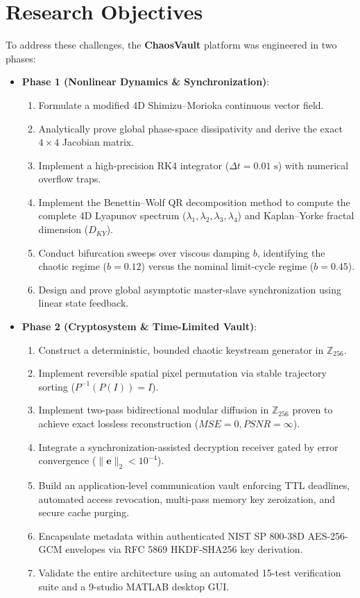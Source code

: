 \documentclass[12pt,a4paper,oneside]{report}
\begin{document}
\section{Research Objectives}
To address these challenges, the \textbf{ChaosVault} platform was engineered in two phases:
\begin{itemize}
    \item \textbf{Phase 1 (Nonlinear Dynamics \& Synchronization)}:
    \begin{enumerate}
        \item Formulate a modified 4D Shimizu--Morioka continuous vector field.
        \item Analytically prove global phase-space dissipativity and derive the exact $4 \times 4$ Jacobian matrix.
        \item Implement a high-precision RK4 integrator ($\Delta t = 0.01\text{ s}$) with numerical overflow traps.
        \item Implement the Benettin--Wolf QR decomposition method to compute the complete 4D Lyapunov spectrum ($\lambda_1, \lambda_2, \lambda_3, \lambda_4$) and Kaplan--Yorke fractal dimension ($D_{KY}$).
        \item Conduct bifurcation sweeps over viscous damping $b$, identifying the chaotic regime ($b=0.12$) versus the nominal limit-cycle regime ($b=0.45$).
        \item Design and prove global asymptotic master-slave synchronization using linear state feedback.
    \end{enumerate}
    \item \textbf{Phase 2 (Cryptosystem \& Time-Limited Vault)}:
    \begin{enumerate}
        \item Construct a deterministic, bounded chaotic keystream generator in $\mathbb{Z}_{256}$.
        \item Implement reversible spatial pixel permutation via stable trajectory sorting ($P^{-1}(P(I)) = I$).
        \item Implement two-pass bidirectional modular diffusion in $\mathbb{Z}_{256}$ proven to achieve exact lossless reconstruction ($MSE=0, PSNR=\infty$).
        \item Integrate a synchronization-assisted decryption receiver gated by error convergence ($\|\mathbf{e}\|_2 < 10^{-4}$).
        \item Build an application-level communication vault enforcing TTL deadlines, automated access revocation, multi-pass memory key zeroization, and secure cache purging.
        \item Encapsulate metadata within authenticated NIST SP 800-38D AES-256-GCM envelopes via RFC 5869 HKDF-SHA256 key derivation.
        \item Validate the entire architecture using an automated 15-test verification suite and a 9-studio MATLAB desktop GUI.
    \end{enumerate}
\end{itemize}
\end{document}
